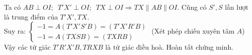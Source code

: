 \documentclass[12pt,a4paper]{article}
\begin{document}
Ta có $AB\perp OI;\enspace T'X'\perp OI;\enspace TX\perp OI\Rightarrow TX\parallel AB\parallel OI$. Cũng có $S',S$ lần lượt là trung điểm của $T'X',TX$.\\

Suy ra: $\begin{cases}
	-1=A(T'X'S'B)=(T'X'R'B)\\
	-1=A(TXSB)=(TXRB)
\end{cases}$ (Xét phép chiếu xuyên tâm $A$)\\

Vậy các tứ giác $T'R'X'B, TRXB$ là tứ giác điều hoà. Hoàn tất chứng minh.
\end{document}
